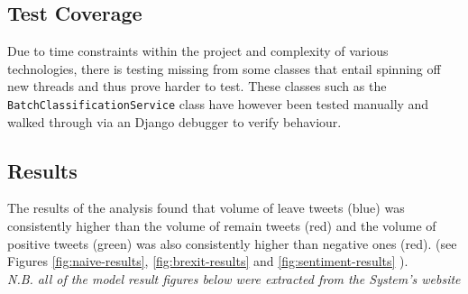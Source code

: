 \documentclass[11pt]{report}
\begin{document}
\subsection*{Test Coverage}
Due to time constraints within the project and complexity of various technologies, there is testing missing from some classes that entail spinning off new threads and thus prove harder to test. These classes such as the \texttt{BatchClassificationService} class have however been tested manually and walked through via an Django debugger to verify behaviour.


\subsection*{Results}
The results of the analysis found that volume of leave tweets (blue) was consistently higher than the volume of remain tweets (red) and the volume of positive tweets (green) was also consistently higher than negative ones (red). (see Figures \ref{fig:naive-results}, \ref{fig:brexit-results} and \ref{fig:sentiment-results} ). 
\\

\textit{N.B. all of the model result figures below were extracted from the System's website}
\end{document}
